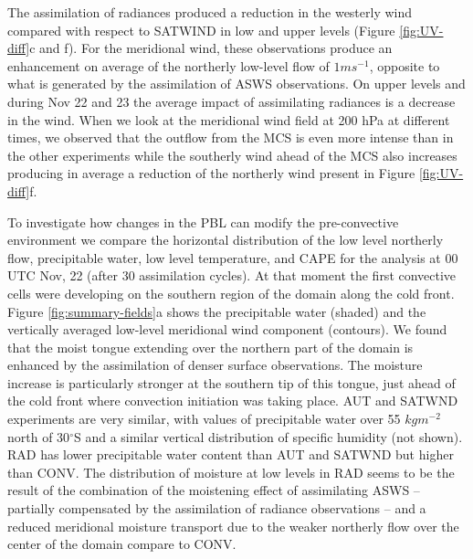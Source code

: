 \documentclass[final,5p,times,twocolumn,authoryear]{elsarticle} %
\begin{document}
The assimilation of radiances produced a reduction in the westerly wind compared with respect to SATWIND in low and upper levels (Figure \ref{fig:UV-diff}c and f). For the meridional wind, these observations produce an enhancement on average of the northerly low-level flow of \(1 ms^{-1}\), opposite to what is generated by the assimilation of ASWS observations. On upper levels and during Nov 22 and 23 the average impact of assimilating radiances is a decrease in the wind. When we look at the meridional wind field at 200 hPa at different times, we observed that the outflow from the MCS is even more intense than in the other experiments while the southerly wind ahead of the MCS also increases producing in average a reduction of the northerly wind present in Figure \ref{fig:UV-diff}f.~

To investigate how changes in the PBL can modify the pre-convective environment we compare the horizontal distribution of the low level northerly flow, precipitable water, low level temperature, and CAPE for the analysis at 00 UTC Nov, 22 (after 30 assimilation cycles). At that moment the first convective cells were developing on the southern region of the domain along the cold front. Figure \ref{fig:summary-fields}a shows the precipitable water (shaded) and the vertically averaged low-level meridional wind component (contours). We found that the moist tongue extending over the northern part of the domain is enhanced by the assimilation of denser surface observations. The moisture increase is particularly stronger at the southern tip of this tongue, just ahead of the cold front where convection initiation was taking place. AUT and SATWND experiments are very similar, with values of precipitable water over 55 \(kgm^{-2}\) north of 30\(^{\circ}\)S and a similar vertical distribution of specific humidity (not shown). RAD has lower precipitable water content than AUT and SATWND but higher than CONV. The distribution of moisture at low levels in RAD seems to be the result of the combination of the moistening effect of assimilating ASWS -- partially compensated by the assimilation of radiance observations -- and a reduced meridional moisture transport due to the weaker northerly flow over the center of the domain compare to CONV.
\end{document}

